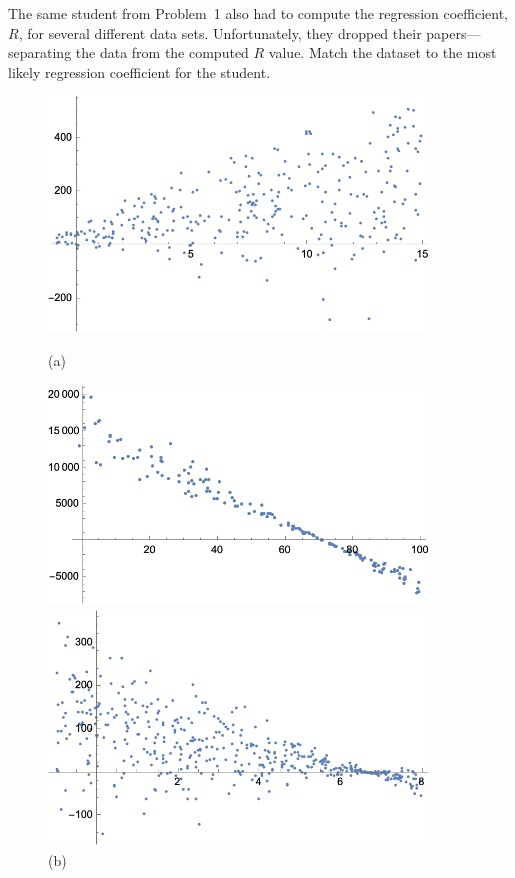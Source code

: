 \documentclass[12pt,letterpaper]{exam}
\begin{document}
\begin{questions}
\newpage
\question[8] The same student from Problem~1 also had to compute the regression coefficient, $R$, for several different data sets. Unfortunately, they dropped their papers---separating the data from the computed $R$ value. Match the dataset to the most likely regression coefficient for the student. \pspace
	\begin{figure}[!ht]
	\centering
	\begin{minipage}{0.45\textwidth}
	   \centering
	   \includegraphics[width=0.9\textwidth]{reg1.png}
	   \caption*{(a)}
	\end{minipage}\hfill
	\begin{minipage}{0.45\textwidth}
	   \centering
	   \includegraphics[width=0.9\textwidth]{reg2.png}
	   \caption*{(b)}
	\end{minipage}
	\begin{minipage}{0.45\textwidth}
	   \centering
	   \includegraphics[width=0.9\textwidth]{reg3.png}

\end{minipage}
\end{figure}
\end{questions}
\end{document}
